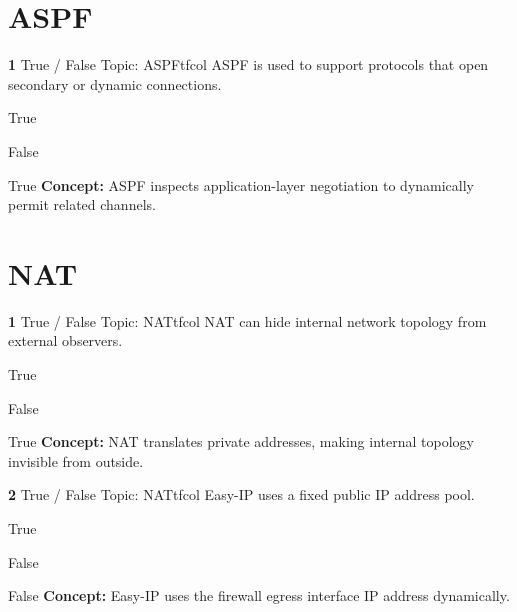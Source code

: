 \documentclass[10pt,a4paper]{article}
\begin{document}
\section{ASPF}
\begin{qcard}{\color{white}\textbf{1} \hfill \small True / False \textbar{} Topic: ASPF}{tfcol}
ASPF is used to support protocols that open secondary or dynamic connections.

\begin{qoptions}
\item True
\item False
\end{qoptions}
\begin{explainbox}{True}
\textbf{Concept:} ASPF inspects application-layer negotiation to dynamically permit related channels.
\end{explainbox}
\end{qcard}

\section{NAT}
\begin{qcard}{\color{white}\textbf{1} \hfill \small True / False \textbar{} Topic: NAT}{tfcol}
NAT can hide internal network topology from external observers.

\begin{qoptions}
\item True
\item False
\end{qoptions}
\begin{explainbox}{True}
\textbf{Concept:} NAT translates private addresses, making internal topology invisible from outside.
\end{explainbox}
\end{qcard}

\begin{qcard}{\color{white}\textbf{2} \hfill \small True / False \textbar{} Topic: NAT}{tfcol}
Easy-IP uses a fixed public IP address pool.

\begin{qoptions}
\item True
\item False
\end{qoptions}
\begin{explainbox}{False}
\textbf{Concept:} Easy-IP uses the firewall egress interface IP address dynamically.
\end{explainbox}
\end{qcard}
\end{document}
